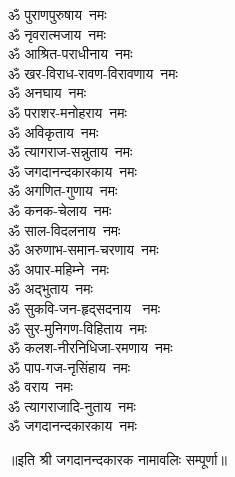 \begin{flushleft}
\begin{multicols}{2}
ॐ पुराणपुरुषाय~नमः\\
ॐ नृवरात्मजाय~नमः\hfill{}\\
ॐ आश्रित-पराधीनाय~नमः\\
ॐ खर-विराध-रावण-विरावणाय~नमः\\
ॐ अनघाय~नमः\\
ॐ पराशर-मनोहराय~नमः\\
ॐ अविकृताय~नमः\\
ॐ त्यागराज-सन्नुताय~नमः\\
ॐ जगदानन्दकारकाय~नमः\\
ॐ अगणित-गुणाय~नमः\\
ॐ कनक-चेलाय~नमः\\
ॐ साल-विदलनाय~नमः\hfill{}\\
ॐ अरुणाभ-समान-चरणाय~नमः\\
ॐ अपार-महिम्ने~नमः\\
ॐ अद्भुताय~नमः\\
ॐ सुकवि-जन-हृद्सदनाय ~नमः\\
ॐ सुर-मुनिगण-विहिताय~नमः\\
ॐ कलश-नीरनिधिजा-रमणाय~नमः\\
ॐ पाप-गज-नृसिंहाय~नमः\\
ॐ वराय~नमः\\
ॐ त्यागराजादि-नुताय~नमः\\
ॐ जगदानन्दकारकाय~नमः\hfill{}\\
\end{multicols}
\end{flushleft}
॥इति श्री जगदानन्दकारक नामावलिः सम्पूर्णा॥
